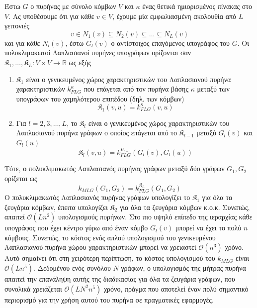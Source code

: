 Έστω $G$ ο πυρήνας με σύνολο κόμβων $V$ και $\kappa$ ένας θετικά ημιορισμένος πίνακας στο $V$.
Ας υποθέσουμε ότι για κάθε $v \in V$, έχουμε μία εμφωλιασμένη ακολουθία από $L$ γειτονιές
\begin{equation}
    v \in N_1(v) \subseteq N_2(v) \subseteq \ldots \subseteq N_L(v)
\end{equation}
και για κάθε $N_l(v)$, έστω $G_l(v)$ ο αντίστοιχος επαγόμενος υπογράφος του $G$.
Οι πολυκλιμακωτοί Λαπλασιανοί πυρήνες υπογράφων ορίζονται σαν $\mathfrak{K}_1, \ldots, \mathfrak{K}_L : V \times V \rightarrow \mathbb{R}$ ως εξής
\begin{enumerate}
    \item $\mathfrak{K}_1$ είναι ο γενικευμένος χώρος χαρακτηριστικών του Λαπλασιανού πυρήνα χαρακτηριστικών $k_{FLG}^\kappa$ που επάγεται από τον πυρήνα βάσης $\kappa$ μεταξύ των υπογράφων του χαμηλότερου επιπέδου (δηλ. των κόμβων)
    \begin{equation}
        \mathfrak{K}_1(v,u) = k_{FLG}^\kappa(v, u)
    \end{equation}
    \item Για $l=2,3,\ldots,L$, το $\mathfrak{K}_l$ είναι ο γενικευμένος χώρος χαρακτηριστικών  του Λαπλασιανού πυρήνα γράφων ο οποίος επάγεται από το  $\mathfrak{K}_{l-1}$ μεταξύ  $G_l(v)$ και $G_l(u)$
    \begin{equation}
        \mathfrak{K}_l(v,u) = k_{FLG}^{\mathfrak{K}_{l-1}}(G_l(v), G_l(u))
    \end{equation}
\end{enumerate}
Τότε, ο πολυκλιμακωτός Λαπλασιανός πυρήνας γράφων μεταξύ δύο γράφων $G_1, G_2$ ορίζεται ως
\begin{equation*}
    k_{MLG}(G_1, G_2) = k_{FLG}^{\mathfrak{K}_L}(G_1, G_2)
\end{equation*}
Ο πολυκλιμακωτός Λαπλασιανός πυρήνας γράφων υπολογίζει το $\mathfrak{K}_1$ για όλα τα ζευγάρια κόμβων, έπειτα υπολογίζει $\mathfrak{K}_2$ για όλα τα ζευγάρια κόμβων κ.ο.κ.
Συνεπώς, απαιτεί $\mathcal{O}(Ln^2)$ υπολογισμούς πυρήνων.
Στο πιο υψηλό επίπεδο της ιεραρχίας κάθε υπογράφος που έχει κέντρο γύρω από έναν κόμβο $G_l(v)$ μπορεί να έχει το πολύ $n$ κόμβους.
Συνεπώς, το κόστος ενός απλού υπολογισμού του γενικευμένου Λαπλασιανού πυρήνα χώρου χαρακτηριστικών μπορεί να χρειαστεί $\mathcal{O}(n^3)$ χρόνο.
Αυτό σημαίνει ότι στη χειρότερη περίπτωση, το κόστος υπολογισμού του $k_{MLG}$ είναι $\mathcal{O}(Ln^5)$.
Δεδομένου ενός συνόλου $N$ γράφων, ο υπολογισμός της μήτρας πυρήνα απαιτεί την επανάληψη αυτής της διαδικασίας για όλα τα ζευγάρια γράφων, που συνολικά χρειάζεται $\mathcal{O}(LN^2n^5)$ χρόνο, πράγμα που αποτελεί έναν πολύ σημαντικό περιορισμό για την χρήση αυτού του πυρήνα σε πραγματικές εφαρμογές.\par
